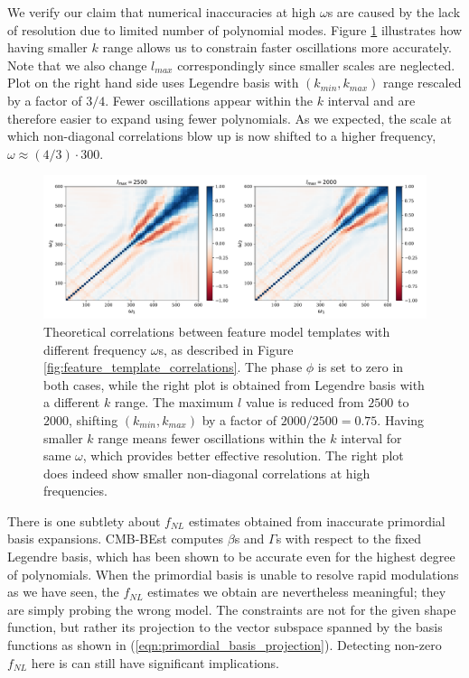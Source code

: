 We verify our claim that numerical inaccuracies at high $\omega$s are caused by the lack of resolution due to limited number of polynomial modes. Figure \ref{fig:feature_template_correlations_compare_lmax} illustrates how having smaller $k$ range allows us to constrain faster oscillations more accurately. Note that we also change $l_{max}$ correspondingly since smaller scales are neglected. Plot on the right hand side uses Legendre basis with $(k_{min}, k_{max})$ range rescaled by a factor of $3/4$. Fewer oscillations appear within the $k$ interval and are therefore easier to expand using fewer polynomials. As we expected, the scale at which non-diagonal correlations blow up is now shifted to a higher frequency, $\omega \approx (4/3) \cdot 300$. 

\begin{figure}[htbp!] 
	\centering    
	\includegraphics[width=\textwidth]{sine_template_correlations_compare_lmax_new.pdf}
	\caption{Theoretical correlations between feature model templates with different frequency $\omega$s, as described in Figure \ref{fig:feature_template_correlations}. The phase $\phi$ is set to zero in both cases, while the right plot is obtained from Legendre basis with a different $k$ range. The maximum $l$ value is reduced from $2500$ to $2000$, shifting $(k_{min},k_{max})$ by a factor of $2000/2500 = 0.75$. Having smaller $k$ range means fewer oscillations within the $k$ interval for same $\omega$, which provides better effective resolution. The right plot does indeed show smaller non-diagonal correlations at high frequencies.}
	\label{fig:feature_template_correlations_compare_lmax}
\end{figure}

There is one subtlety about $f_{NL}$ estimates obtained from inaccurate primordial basis expansions. CMB-BEst computes $\beta$s and $\Gamma$s with respect to the fixed Legendre basis, which has been shown to be accurate even for the highest degree of polynomials. When the primordial basis is unable to resolve rapid modulations as we have seen, the $f_{NL}$ estimates we obtain are nevertheless meaningful; they are simply probing the wrong model. The constraints are not for the given shape function, but rather its projection to the vector subspace spanned by the basis functions as shown in (\ref{eqn:primordial_basis_projection}). Detecting non-zero $f_{NL}$ here is can still have significant implications.

